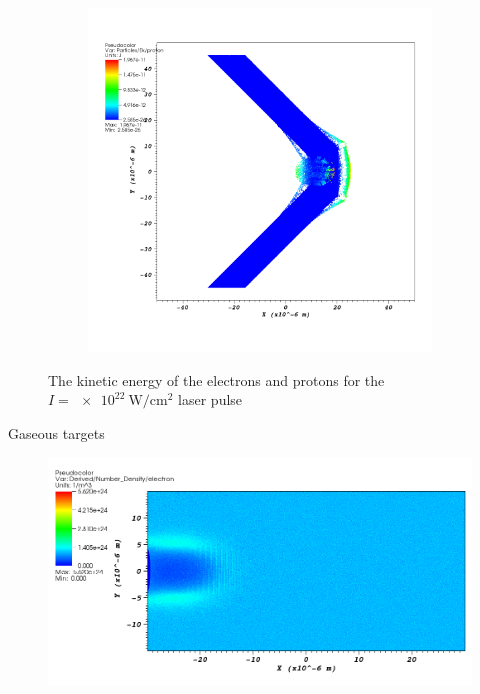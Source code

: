 \documentclass{beamer}
\begin{document}
\begin{frame}
\begin{figure}[h]
\begin{subfigure}[b]{0.475\textwidth}
	    \includegraphics[width=\textwidth]{i22-ek-init-p}
	  \end{subfigure}
	  \caption{The kinetic energy of the electrons and protons for the
	  \(I=\SI{e22}{\watt\per\centi\metre\squared}\) laser pulse}%
	\end{figure}
\end{frame}

%
\begin{frame}{Gaseous targets}
	\begin{figure}
		\includegraphics[width=\textwidth]{lwfa-i18-n-init-e}
	\end{figure}
\end{frame}
\end{document}
